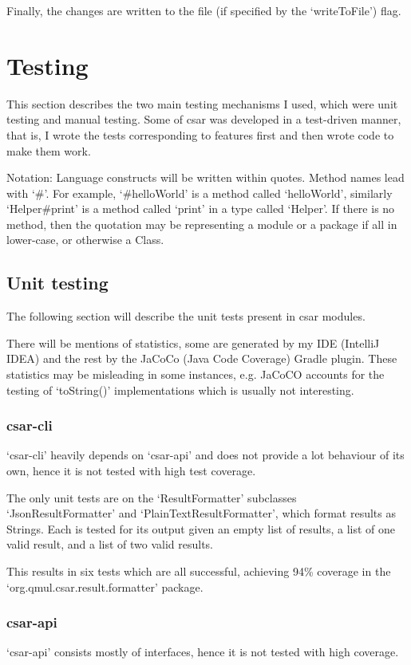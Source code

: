 \documentclass[12pt, letterpaper]{article}
\begin{document}
Finally, the changes are written to the file (if specified by the `writeToFile') flag.

\section{Testing}
This section describes the two main testing mechanisms I used, which were unit testing and manual testing.
Some of csar was developed in a test-driven manner, that is, I wrote the tests corresponding to features first and then wrote code to make them work.

Notation: Language constructs will be written within quotes.
Method names lead with `\#'.
For example, `\#helloWorld' is a method called `helloWorld', similarly `Helper\#print' is a method called `print' in a type called `Helper'.
If there is no method, then the quotation may be representing a module or a package if all in lower-case, or otherwise a Class.

\subsection{Unit testing}
The following section will describe the unit tests present in csar modules.

There will be mentions of statistics, some are generated by my IDE (IntelliJ IDEA) and the rest by the JaCoCo (Java Code Coverage) Gradle plugin.
These statistics may be misleading in some instances, e.g. JaCoCO accounts for the testing of `toString()' implementations which is usually not interesting.

\subsubsection{csar-cli}
`csar-cli' heavily depends on `csar-api' and does not provide a lot behaviour of its own, hence it is not tested with high test coverage.

The only unit tests are on the `ResultFormatter' subclasses `JsonResultFormatter' and `PlainTextResultFormatter', which format results as Strings.
Each is tested for its output given an empty list of results, a list of one valid result, and a list of two valid results.

This results in six tests which are all successful, achieving 94\% coverage in the `org.qmul.csar.result.formatter' package.

\subsubsection{csar-api}
`csar-api' consists mostly of interfaces, hence it is not tested with high coverage.
\end{document}
